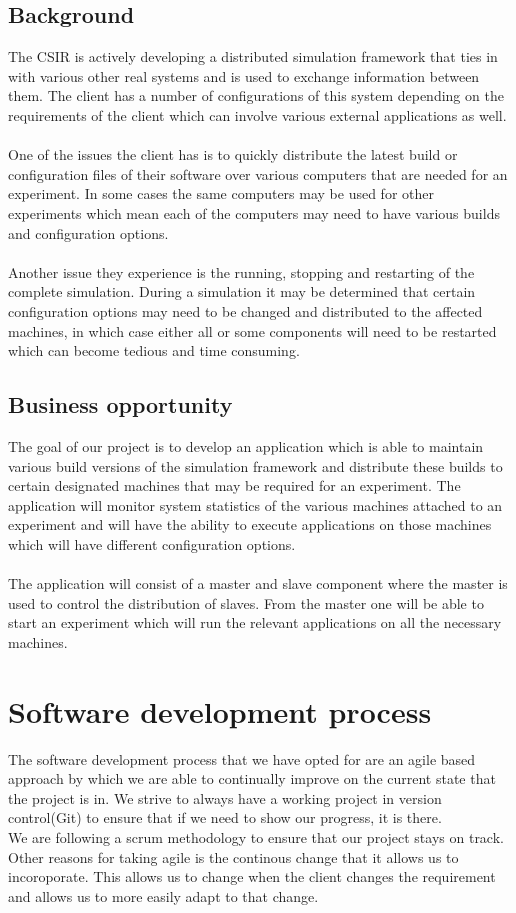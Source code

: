 \documentclass[a4paper,12pt,final]{article}
\begin{document}
\subsection{Background}
The CSIR is actively developing a distributed simulation framework that ties
in with various other real systems and is used to exchange information
between them. The client has a number of configurations of this system
depending on the requirements of the client which can involve various
external applications as well.\\
\textbf{\\}
One of the issues the client has is to quickly distribute the latest build or
configuration files of their software over various computers that are needed
for an experiment. In some cases the same computers may be used for other
experiments which mean each of the computers may need to have various
builds and configuration options.\\
\textbf{\\}
Another issue they experience is the running, stopping and restarting of
the complete simulation. During a simulation it may be determined that
certain configuration options may need to be changed and distributed to the
affected machines, in which case either all or some components will need to
be restarted which can become tedious and time consuming.
\subsection{Business opportunity}
The goal of our project is to develop an application which is able to maintain
various build versions of the simulation framework and distribute these builds
to certain designated machines that may be required for an experiment. The
application will monitor system statistics of the various machines attached
to an experiment and will have the ability to execute applications on those
machines which will have different configuration options.\\
\textbf{\\}
The application will consist of a master and slave component where the
master is used to control the distribution of slaves. From the master one will
be able to start an experiment which will run the relevant applications on all
the necessary machines.




\section{Software development process}
The software development process that we have opted for are an agile based approach by which we are able to continually improve on the current state that the project is in. We strive to always have a working project in version control(Git) to ensure that if we need to show our progress, it is there.
\\
We are following a scrum methodology to ensure that our project stays on track. 
\\
Other reasons for taking agile is the continous change that it allows us to incoroporate. This allows us to change when the client changes the requirement and allows us to more easily adapt to that change.
\end{document}
